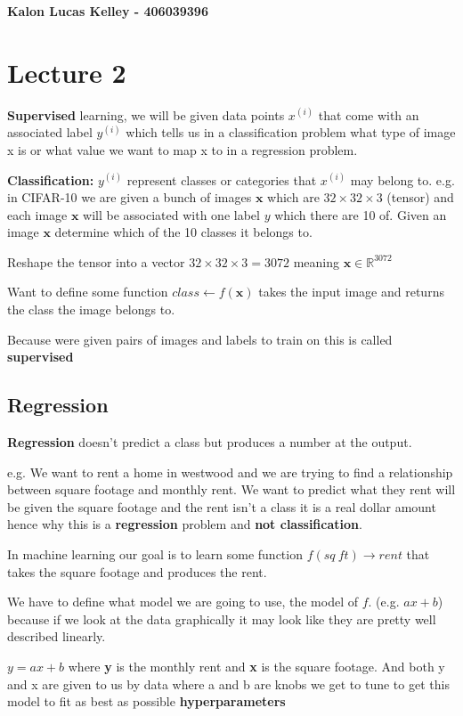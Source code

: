 \documentclass[twocolumn, letter, 10pt, landscape]{article}
\begin{document}
\textbf{Kalon Lucas Kelley - 406039396}

\section{Lecture 2}
\textbf{Supervised} learning, we will be given data points $x^{(i)}$ that come with an associated label $y^{(i)}$ which tells us in a classification problem what type of image x is or what value we want to map x to in a regression problem.

\textbf{Classification:} $y^{(i)}$ represent classes or categories that $x^{(i)}$ may belong to. e.g. in CIFAR-10 we are given a bunch of images $\mathbf{x}$ which are $32\times 32 \times 3$ (tensor) and each image $\mathbf{x}$ will be associated with one label $y$ which there are 10 of. Given an image $\mathbf{x}$ determine which of the 10 classes it belongs to.

Reshape the tensor into a vector $32\times 32\times 3 = 3072$ meaning $\mathbf{x}\in \mathbb{R}^{3072}$

Want to define some function $class\leftarrow f(\mathbf{x})$ takes the input image and returns the class the image belongs to.

Because were given pairs of images and labels to train on this is called \textbf{supervised}

\subsection{Regression}
\textbf{Regression} doesn't predict a class but produces a number at the output.

e.g. We want to rent a home in westwood and we are trying to find a relationship between square footage and monthly rent. We want to predict what they rent will be given the square footage and the rent isn't a class it is a real dollar amount hence why this is a \textbf{regression} problem and \textbf{not classification}.

In machine learning our goal is to learn some function $f(sq\:ft) \rightarrow rent$ that takes the square footage and produces the rent.

We have to define what model we are going to use, the model of $f$. (e.g. $ax+b$) because if we look at the data graphically it may look like they are pretty well described linearly.

$y = ax+b$ where \textbf{y} is the monthly rent and \textbf{x} is the square footage. And both y and x are given to us by data where a and b are knobs we get to tune to get this model to fit as best as possible \textbf{hyperparameters}
\end{document}
